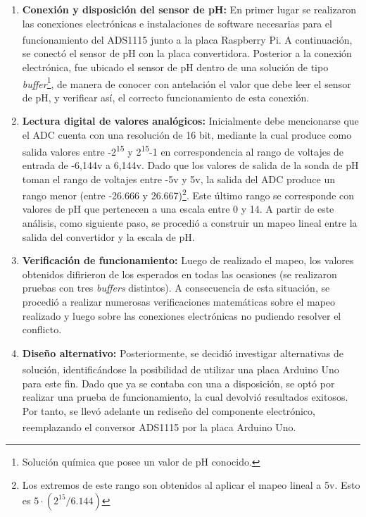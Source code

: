                 \begin{enumerate}

                \item \textbf{Conexión y disposición del sensor de pH:} En primer lugar se realizaron las conexiones electrónicas e instalaciones de software necesarias para el funcionamiento del ADS1115 junto a la placa Raspberry\textsuperscript{\textregistered} Pi. A continuación, se conectó el sensor de pH con la placa convertidora. Posterior a la conexión electrónica, fue ubicado el sensor de pH dentro de una solución de tipo \textit{buffer}\footnote{Solución química que posee un valor de pH conocido.}, de manera de conocer con antelación el valor que debe leer el sensor de pH, y verificar así, el correcto funcionamiento de esta conexión.
                
                \item \textbf{Lectura digital de valores analógicos:} Inicialmente debe mencionarse que el ADC cuenta con una resolución de 16 bit, mediante la cual produce como salida valores entre -2\textsuperscript{15} y 2\textsuperscript{15}-1 en correspondencia al rango de voltajes de entrada de -6,144v a 6,144v. Dado que los valores de salida de la sonda de pH toman el rango de voltajes entre -5v y 5v, la salida del ADC produce un rango menor (entre -26.666 y 26.667)\footnote{ Los extremos de este rango son obtenidos al aplicar el mapeo lineal a 5v. Esto es $ 5 \cdot (2^{15} / 6.144)$  }. Este último rango se corresponde con valores de pH que pertenecen a una escala entre 0 y 14. A partir de este análisis, como siguiente paso, se procedió a construir un mapeo lineal entre la salida del convertidor y la escala de pH.
                
                \item \textbf{Verificación de funcionamiento:} Luego de realizado el mapeo, los valores obtenidos difirieron de los esperados en todas las ocasiones (se realizaron pruebas con tres \textit{buffers} distintos). A consecuencia de esta situación, se procedió a realizar numerosas verificaciones matemáticas sobre el mapeo realizado y luego sobre las conexiones electrónicas no pudiendo resolver el conflicto.
                
                \item \textbf{Diseño alternativo:} Posteriormente, se decidió investigar alternativas de solución, identificándose la posibilidad de utilizar una placa Arduino \textsuperscript{\textregistered} Uno para este fin. Dado que ya se contaba con una a disposición, se optó por realizar una prueba de funcionamiento, la cual devolvió resultados exitosos. Por tanto, se llevó adelante un rediseño del componente electrónico, reemplazando el conversor ADS1115 por la placa  Arduino\textsuperscript{\textregistered} Uno.
                \end{enumerate}
                
